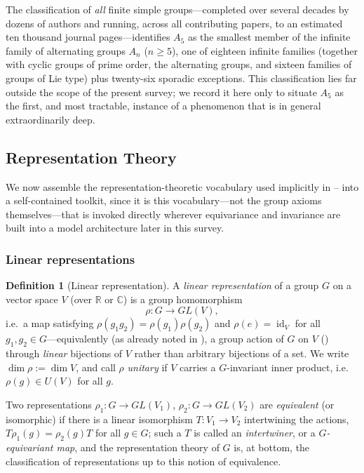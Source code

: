 \documentclass[11pt]{article}
\theoremstyle{plain}
\theoremstyle{definition}
\newtheorem{Definition}{Definition}[section]
\begin{document}
The classification of \emph{all} finite simple groups---completed over
several decades by dozens of authors and running, across all contributing
papers, to an estimated ten thousand journal pages---identifies $A_5$ as the
smallest member of the infinite family of alternating groups $A_n$
($n \geq 5$), one of eighteen infinite families (together with cyclic groups
of prime order, the alternating groups, and sixteen families of groups of
Lie type) plus twenty-six sporadic exceptions. This classification lies far
outside the scope of the present survey; we record it here only to situate
$A_5$ as the first, and most tractable, instance of a phenomenon that is in
general extraordinarily deep.

%
\subsection{Representation Theory}
\label{subsec:representation-theory}

We now assemble the representation-theoretic vocabulary used implicitly in
--
into a self-contained toolkit, since it is this vocabulary---not the group
axioms themselves---that is invoked directly wherever equivariance and
invariance are built into a model architecture later in this survey.

\subsubsection{Linear representations}
\label{subsubsec:linear-representations}

\begin{Definition}[Linear representation]
\label{def:linear-representation}
A \emph{linear representation} of a group $G$ on a vector space $V$ (over
$\mathbb{R}$ or $\mathbb{C}$) is a group homomorphism
\[
    \rho : G \longrightarrow GL(V),
\]
i.e.\ a map satisfying $\rho(g_1 g_2) = \rho(g_1)\rho(g_2)$ and
$\rho(e) = \operatorname{id}_V$ for all $g_1, g_2 \in G$---equivalently (as already
noted in ), a group action of $G$ on $V$
() through \emph{linear} bijections of $V$
rather than arbitrary bijections of a set. We write $\dim \rho := \dim V$,
and call $\rho$ \emph{unitary} if $V$ carries a $G$-invariant inner product,
i.e.\ $\rho(g) \in U(V)$ for all $g$.
\end{Definition}

Two representations $\rho_1 : G \to GL(V_1)$, $\rho_2 : G \to GL(V_2)$ are
\emph{equivalent} (or isomorphic) if there is a linear isomorphism
$T : V_1 \to V_2$ intertwining the actions,
$T \rho_1(g) = \rho_2(g) T$ for all $g \in G$; such a $T$ is called an
\emph{intertwiner}, or a \emph{$G$-equivariant map}, and the representation
theory of $G$ is, at bottom, the classification of representations up to
this notion of equivalence.
\end{document}
